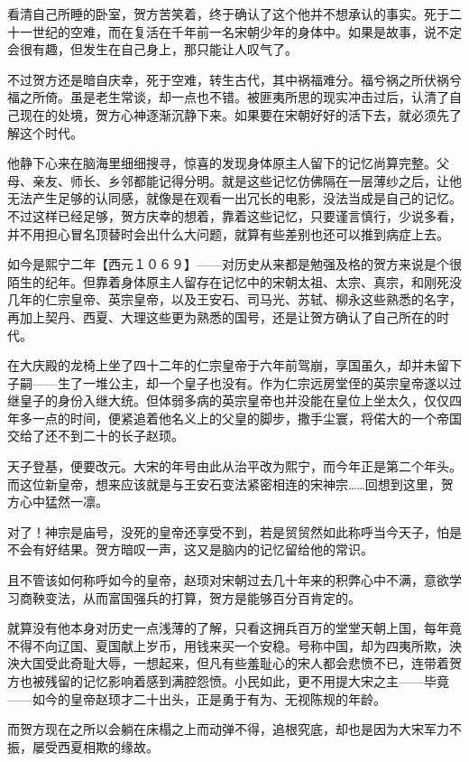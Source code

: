 看清自己所睡的卧室，贺方苦笑着，终于确认了这个他并不想承认的事实。死于二十一世纪的空难，而在复活在千年前一名宋朝少年的身体中。如果是故事，说不定会很有趣，但发生在自己身上，那只能让人叹气了。

不过贺方还是暗自庆幸，死于空难，转生古代，其中祸福难分。福兮祸之所伏祸兮福之所倚。虽是老生常谈，却一点也不错。被匪夷所思的现实冲击过后，认清了自己现在的处境，贺方心神逐渐沉静下来。如果要在宋朝好好的活下去，就必须先了解这个时代。

他静下心来在脑海里细细搜寻，惊喜的发现身体原主人留下的记忆尚算完整。父母、亲友、师长、乡邻都能记得分明。就是这些记忆仿佛隔在一层薄纱之后，让他无法产生足够的认同感，就像是在观看一出冗长的电影，没法当成是自己的记忆。不过这样已经足够，贺方庆幸的想着，靠着这些记忆，只要谨言慎行，少说多看，并不用担心冒名顶替时会出什么大问题，就算有些差别也还可以推到病症上去。

如今是熙宁二年【西元１０６９】——对历史从来都是勉强及格的贺方来说是个很陌生的纪年。但靠着身体原主人留存在记忆中的宋朝太祖、太宗、真宗，和刚死没几年的仁宗皇帝、英宗皇帝，以及王安石、司马光、苏轼、柳永这些熟悉的名字，再加上契丹、西夏、大理这些更为熟悉的国号，还是让贺方确认了自己所在的时代。

在大庆殿的龙椅上坐了四十二年的仁宗皇帝于六年前驾崩，享国虽久，却并未留下子嗣——生了一堆公主，却一个皇子也没有。作为仁宗远房堂侄的英宗皇帝遂以过继皇子的身份入继大统。但体弱多病的英宗皇帝也并没能在皇位上坐太久，仅仅四年多一点的时间，便紧追着他名义上的父皇的脚步，撒手尘寰，将偌大的一个帝国交给了还不到二十的长子赵顼。

天子登基，便要改元。大宋的年号由此从治平改为熙宁，而今年正是第二个年头。而这位新皇帝，想来应该就是与王安石变法紧密相连的宋神宗……回想到这里，贺方心中猛然一凛。

对了！神宗是庙号，没死的皇帝还享受不到，若是贸贸然如此称呼当今天子，怕是不会有好结果。贺方暗叹一声，这又是脑内的记忆留给他的常识。

且不管该如何称呼如今的皇帝，赵顼对宋朝过去几十年来的积弊心中不满，意欲学习商鞅变法，从而富国强兵的打算，贺方是能够百分百肯定的。

就算没有他本身对历史一点浅薄的了解，只看这拥兵百万的堂堂天朝上国，每年竟不得不向辽国、夏国献上岁币，用钱来买一个安稳。号称中国，却为四夷所欺，泱泱大国受此奇耻大辱，一想起来，但凡有些羞耻心的宋人都会悲愤不已，连带着贺方也被残留的记忆影响着感到满腔怨愤。小民如此，更不用提大宋之主——毕竟——如今的皇帝赵顼才二十出头，正是勇于有为、无视陈规的年龄。

而贺方现在之所以会躺在床榻之上而动弹不得，追根究底，却也是因为大宋军力不振，屡受西夏相欺的缘故。

